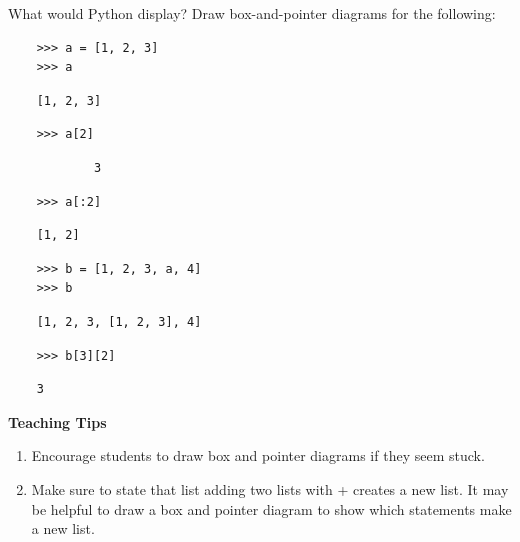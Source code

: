 \begin{blocksection}
    \question What would Python display? Draw box-and-pointer diagrams for the following:
    
    \begin{lstlisting}
    >>> a = [1, 2, 3]
    >>> a
    \end{lstlisting}
    \begin{solution}[.25in]
    \begin{lstlisting}
    [1, 2, 3]
    \end{lstlisting}
    \end{solution}
    
    \begin{lstlisting}
    >>> a[2]
    \end{lstlisting}
    \begin{solution}[.25in]
    \begin{lstlisting}
            3
    \end{lstlisting}
    \end{solution}
    
    \end{blocksection}
    \begin{blocksection}
    
    \begin{lstlisting}
    >>> a[:2]
    \end{lstlisting}
    \begin{solution}[.25in]
    \begin{lstlisting}
    [1, 2]
    \end{lstlisting}
    \end{solution}
    \begin{lstlisting}
    >>> b = [1, 2, 3, a, 4]
    >>> b
    \end{lstlisting}
    \begin{solution}[.25in]
    \begin{lstlisting}
    [1, 2, 3, [1, 2, 3], 4]
    \end{lstlisting}
    \end{solution}

    \begin{lstlisting}
    >>> b[3][2]
    \end{lstlisting}
    \begin{solution}[.25in]
    \begin{lstlisting}
    3
    \end{lstlisting}
    \end{solution}    
\end{blocksection}
        
        
    \begin{questionmeta}
        \textbf{Teaching Tips}
        \begin{enumerate}
                \item Encourage students to draw box and pointer diagrams if they seem stuck. 
                \item Make sure to state that list adding two lists with + creates a new list. It may be helpful to draw a box and pointer diagram to show which statements make a new list.
        \end{enumerate}
    \end{questionmeta}
